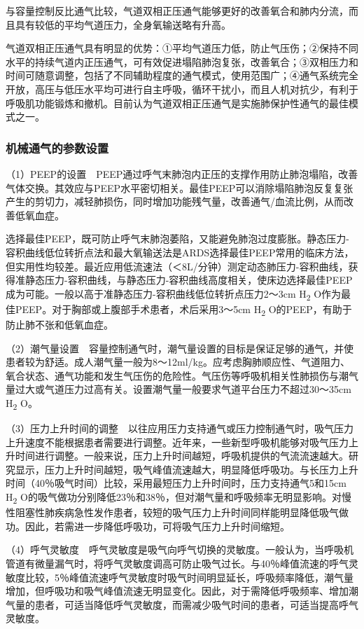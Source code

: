 与容量控制反比通气比较，气道双相正压通气能够更好的改善氧合和肺内分流，而且具有较低的平均气道压力，全身氧输送略有升高。

气道双相正压通气具有明显的优势：①平均气道压力低，防止气压伤；②保持不同水平的持续气道内正压通气，可有效促进塌陷肺泡复张，改善氧合；③双相压力和时间可随意调整，包括了不同辅助程度的通气模式，使用范围广；④通气系统完全开放，高压与低压水平均可进行自主呼吸，循环干扰小，而且人机对抗少，有利于呼吸肌功能锻炼和撤机。目前认为气道双相正压通气是实施肺保护性通气的最佳模式之一。

\subsubsection{机械通气的参数设置}

（1）PEEP的设置　PEEP通过呼气末肺泡内正压的支撑作用防止肺泡塌陷，改善气体交换。其效应与PEEP水平密切相关。最佳PEEP可以消除塌陷肺泡反复复张产生的剪切力，减轻肺损伤，同时增加功能残气量，改善通气/血流比例，从而改善低氧血症。

选择最佳PEEP，既可防止呼气末肺泡萎陷，又能避免肺泡过度膨胀。静态压力-容积曲线低位转折点法和最大氧输送法是ARDS选择最佳PEEP常用的临床方法，但实用性均较差。最近应用低流速法（＜8L/分钟）测定动态肺压力-容积曲线，获得准静态压力-容积曲线，与静态压力-容积曲线高度相关，使床边选择最佳PEEP成为可能。一般以高于准静态压力-容积曲线低位转折点压力2～3cm
H\textsubscript{2}
O作为最佳PEEP。对于胸部或上腹部手术患者，术后采用3～5cm
H\textsubscript{2} O的PEEP，有助于防止肺不张和低氧血症。

（2）潮气量设置　容量控制通气时，潮气量设置的目标是保证足够的通气，并使患者较为舒适。成人潮气量一般为8～12ml/kg。应考虑胸肺顺应性、气道阻力、氧合状态、通气功能和发生气压伤的危险性。气压伤等呼吸机相关性肺损伤与潮气量过大或气道压力过高有关。设置潮气量一般要求气道平台压力不超过30～35cm
H\textsubscript{2} O。

（3）压力上升时间的调整　以往应用压力支持通气或压力控制通气时，吸气压力上升速度不能根据患者需要进行调整。近年来，一些新型呼吸机能够对吸气压力上升时间进行调整。一般来说，压力上升时间越短，呼吸机提供的气流流速越大。研究显示，压力上升时间越短，吸气峰值流速越大，明显降低呼吸功。与长压力上升时间（40％吸气时间）比较，采用最短压力上升时间时，压力支持通气5和15cm
H\textsubscript{2}
O的吸气做功分别降低23％和38％，但对潮气量和呼吸频率无明显影响。对慢性阻塞性肺疾病急性发作患者，较短的吸气压力上升时间同样能明显降低吸气做功。因此，若需进一步降低呼吸功，可将吸气压力上升时间缩短。

（4）呼气灵敏度　呼气灵敏度是吸气向呼气切换的灵敏度。一般认为，当呼吸机管道有微量漏气时，将呼气灵敏度调高可防止吸气过长。与40％峰值流速的呼气灵敏度比较，5％峰值流速呼气灵敏度时吸气时间明显延长，呼吸频率降低，潮气量增加，但呼吸功和吸气峰值流速无明显变化。因此，对于需降低呼吸频率、增加潮气量的患者，可适当降低呼气灵敏度，而需减少吸气时间的患者，可适当提高呼气灵敏度。

